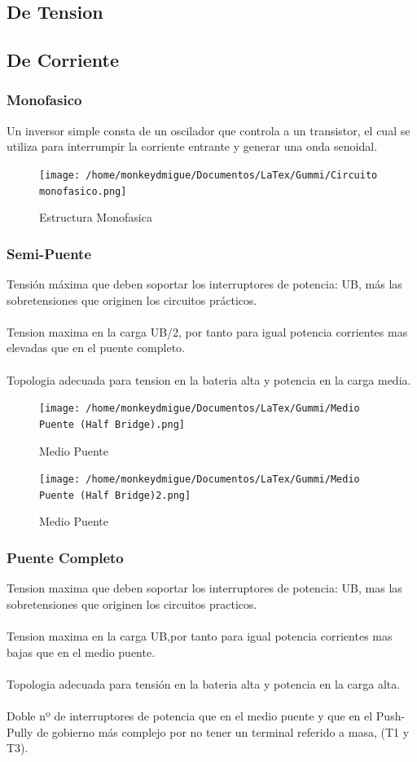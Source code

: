 \documentclass[11pt]{article}
\begin{document}
\subsection{De Tension}

\subsection{De Corriente}
\subsubsection{Monofasico}
Un inversor simple consta de un oscilador que controla a un transistor, el cual se utiliza para interrumpir la corriente entrante y generar una onda senoidal.
\begin{figure}[htp]
\centering
\texttt{[image: /home/monkeydmigue/Documentos/LaTex/Gummi/Circuito monofasico.png]}
\caption{Estructura Monofasica}
\label{}
\end{figure}
\pagebreak
\subsubsection{Semi-Puente}
Tensión máxima que deben soportar los interruptores de potencia: UB, más las sobretensiones que originen los circuitos prácticos.\\\\Tension maxima en la carga UB/2, por tanto para igual potencia corrientes mas elevadas que en el puente completo.\\\\Topologia adecuada para tension en la bateria alta y potencia en la carga media.
\begin{figure}[htp]
\centering
\texttt{[image: /home/monkeydmigue/Documentos/LaTex/Gummi/Medio Puente (Half Bridge).png]}
\caption{Medio Puente}
\label{}
\end{figure}
\begin{figure}[htp]
\centering
\texttt{[image: /home/monkeydmigue/Documentos/LaTex/Gummi/Medio Puente (Half Bridge)2.png]}
\caption{Medio Puente}
\label{}
\end{figure}
\pagebreak
\subsubsection{Puente Completo}
Tension maxima que deben soportar los interruptores de potencia: UB, mas las sobretensiones que originen los circuitos practicos.\\\\Tension maxima en la carga UB,por tanto para igual potencia corrientes mas bajas  que en el medio puente.\\\\Topologia adecuada para tensión en la bateria alta y potencia en la carga alta.\\\\Doble nº de interruptores de potencia que en el medio puente y que en el Push-Pully de gobierno más complejo por no tener un terminal referido a masa, (T1 y T3).
\end{document}
